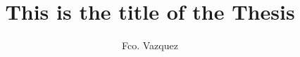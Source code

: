 \documentclass{tufte-book}
\title{This is the title of the Thesis}
\author{Fco. Vazquez}
\begin{document}
\justifying   



\normalsize
\maketitle
\tableofcontents




\end{document}
